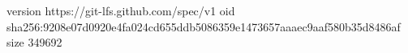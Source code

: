 version https://git-lfs.github.com/spec/v1
oid sha256:9208e07d0920e4fa024cd655ddb5086359e1473657aaaec9aaf580b35d8486af
size 349692
